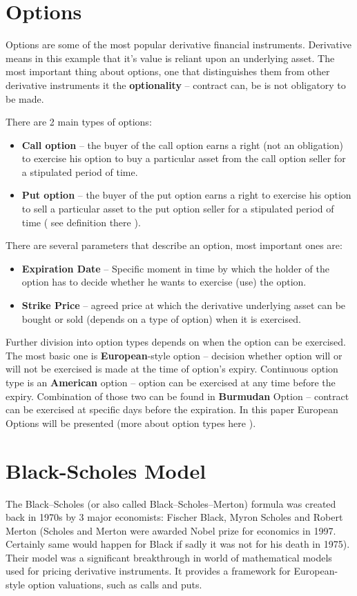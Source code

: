 \section{Options}
    Options are some of the most popular derivative financial instruments. Derivative means in this example that it's value is reliant upon an underlying asset. The most important thing about options, one that distinguishes them from other derivative instruments it the \textbf{optionality} -- contract can, be is not obligatory to be made.
    
    There are 2 main types of options:
    \begin{itemize}
        \item \textbf{Call option} -- the buyer of the call option earns a right (not an obligation) to exercise his option to buy a particular asset from the call option seller for a stipulated period of time.
        \item \textbf{Put option} -- the buyer of the put option earns a right to exercise his option to sell a particular asset to the put option seller for a stipulated period of time ( see definition there \cite{Call_Put_Option_Definition}).
    \end{itemize}
    
    There are several parameters that describe an option, most important ones are:
    \begin{itemize}
        \item \textbf{Expiration Date} -- Specific moment in time by which the holder of the option has to decide whether he wants to exercise (use) the option.
        \item \textbf{Strike Price} -- agreed price at which the derivative underlying asset can be bought or sold (depends on a type of option) when it is exercised.
    \end{itemize}
    
    Further division into option types depends on when the option can be exercised. The most basic one is \textbf{European}-style option -- decision whether option will or will not be exercised is made at the time of option's expiry. Continuous option type is an \textbf{American} option -- option can be exercised at any time before the expiry. Combination of those two can be found in \textbf{Burmudan} Option -- contract can be exercised at specific days before the expiration. In this paper European Options will be presented (more about option types here \cite{Option_Types}).

\section{Black-Scholes Model}
    The Black--Scholes (or also called Black--Scholes--Merton) formula was created back in 1970s by 3 major economists: Fischer Black, Myron Scholes and Robert Merton (Scholes and Merton were awarded Nobel prize for economics in 1997. Certainly same would happen for Black if sadly it was not for his death in 1975).
    Their model was a significant breakthrough in world of mathematical models used for pricing derivative instruments. It provides a framework for European-style option valuations, such as calls and puts.
    
